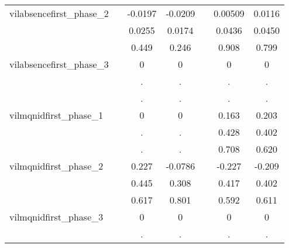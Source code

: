 {\begin{tabular}{l*{6}{c}}
vilabsencefirst\_phase\_2&                     &     -0.0197         &     -0.0209         &                     &     0.00509         &      0.0116         \\
                    &                     &      0.0255         &      0.0174         &                     &      0.0436         &      0.0450         \\
                    &                     &       0.449         &       0.246         &                     &       0.908         &       0.799         \\
vilabsencefirst\_phase\_3&                     &           0         &           0         &                     &           0         &           0         \\
                    &                     &           .         &           .         &                     &           .         &           .         \\
                    &                     &           .         &           .         &                     &           .         &           .         \\
vilmqnidfirst\_phase\_1&                     &           0         &           0         &                     &       0.163         &       0.203         \\
                    &                     &           .         &           .         &                     &       0.428         &       0.402         \\
                    &                     &           .         &           .         &                     &       0.708         &       0.620         \\
vilmqnidfirst\_phase\_2&                     &       0.227         &     -0.0786         &                     &      -0.227         &      -0.209         \\
                    &                     &       0.445         &       0.308         &                     &       0.417         &       0.402         \\
                    &                     &       0.617         &       0.801         &                     &       0.592         &       0.611         \\
vilmqnidfirst\_phase\_3&                     &           0         &           0         &                     &           0         &           0         \\
                    &                     &           .         &           .         &                     &           .         &           .         \\

\end{tabular}}
